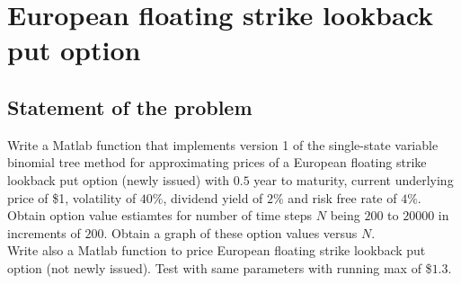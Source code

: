 \newpage

\section{European floating strike lookback put option}
\subsection*{Statement of the problem}
Write a Matlab function that implements version 1 of the single-state variable binomial tree method for approximating prices of a European floating strike lookback put option (newly issued) with $0.5$ year to maturity, current underlying price of \$1, volatility of $40\%$, dividend yield of $2\%$ and risk free rate of $4\%$. Obtain option value estiamtes for number of time steps $N$ being $200$ to $20000$ in increments of $200$. Obtain a graph of these option values versus $N$.\\
Write also a Matlab function to price European floating strike lookback put option (not newly issued). Test with same parameters with running max of \$$1.3$.

